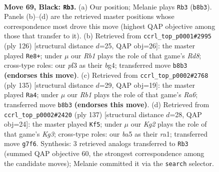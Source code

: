 \documentclass[11pt]{article}
\begin{document}
\clearpage

\begin{figure}[p]\centering
\begin{subfigure}{0.46\textwidth}\centering
\resizebox{\linewidth}{!}{%
\newchessgame
\chessboard[
  setfen={1r6/6k1/B2p3p/B3p1b1/n3P2p/5P2/5K2/7R b - - 8 69},
  showmover=false,
  pgfstyle=straightmove, color=movearrow, markmove={b8-b3}
]}
\caption{}
\end{subfigure}\hfill
\begin{subfigure}{0.46\textwidth}\centering
\resizebox{\linewidth}{!}{%
\newchessgame
\chessboard[
  setfen={3R4/8/8/P6p/1B2k1bP/2P3P1/r7/6K1 w - - 17 64},
  showmover=false,
  pgfstyle=straightmove, color=movearrow, markmove={d8-e8}
]}
\caption{}
\end{subfigure}
\\[4pt]
\begin{subfigure}{0.46\textwidth}\centering
\resizebox{\linewidth}{!}{%
\newchessgame
\chessboard[
  setfen={1k6/7R/3p4/3Pp2p/4P1bP/r7/5K2/5B2 b - - 34 68},
  showmover=false,
  pgfstyle=straightmove, color=movearrow, markmove={a3-a4}
]}
\caption{}
\end{subfigure}\hfill
\begin{subfigure}{0.46\textwidth}\centering
\resizebox{\linewidth}{!}{%
\newchessgame
\chessboard[
  setfen={3r4/8/6k1/6pp/4p3/2K2bP1/5P1R/R7 b - - 11 69},
  showmover=false,
  pgfstyle=straightmove, color=movearrow, markmove={g6-f5}
]}
\caption{}
\end{subfigure}
\caption{\textbf{Move 69, Black: \texttt{Rb3}.} (a) Our position; Melanie plays \texttt{Rb3} (\texttt{b8b3}). Panels (b)--(d) are the retrieved master positions whose correspondence most drove this move (highest QAP objective among those that transfer to it). (b) Retrieved from \texttt{ccrl\_top\_p0001\#2995} (ply 126) [structural distance $d$=25, QAP obj=26]: the master played \texttt{Re8+}; under $\mu$ our \emph{Rb1} plays the role of that game's \emph{Rd8}; cross-type roles: our \emph{p}f3 as their \emph{b}g4; transferred move \texttt{b8b3} \textbf{(endorses this move)}. (c) Retrieved from \texttt{ccrl\_top\_p0002\#2768} (ply 135) [structural distance $d$=29, QAP obj=19]: the master played \texttt{Ra4}; under $\mu$ our \emph{Rb1} plays the role of that game's \emph{Ra6}; transferred move \texttt{b8b3} \textbf{(endorses this move)}. (d) Retrieved from \texttt{ccrl\_top\_p0002\#2420} (ply 137) [structural distance $d$=28, QAP obj=24]: the master played \texttt{Kf5}; under $\mu$ our \emph{Kg2} plays the role of that game's \emph{Kg3}; cross-type roles: our \emph{b}a5 as their \emph{r}a1; transferred move \texttt{g7f6}. Synthesis: 3 retrieved analogs transferred to \texttt{Rb3} (summed QAP objective 60, the strongest correspondence among the candidate moves); Melanie committed it via the \texttt{search} selector.}
\label{fig:thought-m137}
\end{figure}
\end{document}
